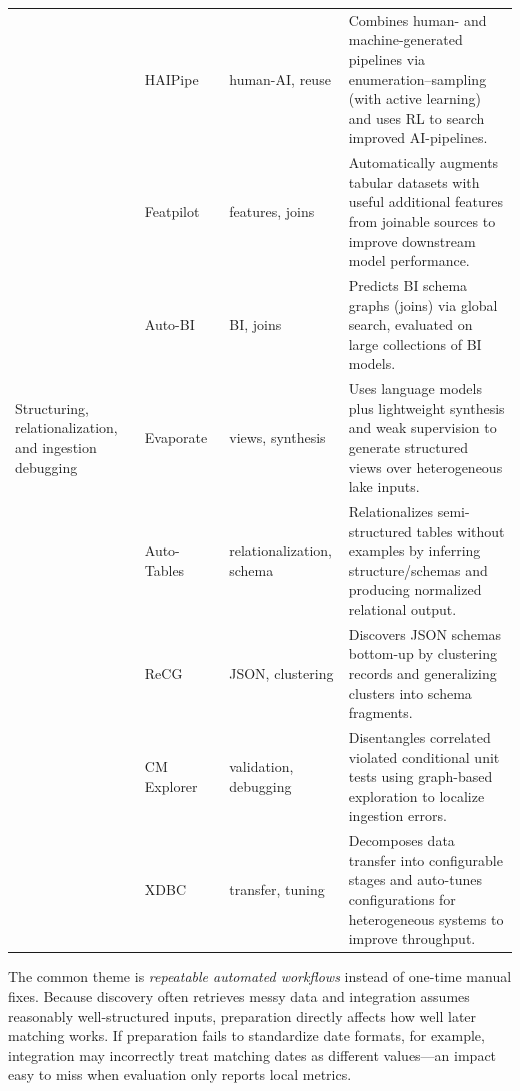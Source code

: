 \documentclass[sigconf]{acmart}
\begin{document}
\begin{table}[!htbp]
\begin{tabularx}{\textwidth}{@{}p{24mm}p{28mm}p{18mm}Y@{}}
~ &
HAIPipe~\cite{10.1145/3588945} &
human-AI, reuse &
Combines human- and machine-generated pipelines via enumeration--sampling (with active learning) and uses RL to search improved AI-pipelines. \\

~ &
Featpilot~\cite{11113027} &
features, joins &
Automatically augments tabular datasets with useful additional features from joinable sources to improve downstream model performance. \\

~ &
Auto-BI~\cite{10.14778/3603581.3603596} &
BI, joins &
Predicts BI schema graphs (joins) via global search, evaluated on large collections of BI models. \\

\midrule

Structuring, relationalization, and ingestion debugging &
Evaporate~\cite{10.14778/3626292.3626294} &
views, synthesis &
Uses language models plus lightweight synthesis and weak supervision to generate structured views over heterogeneous lake inputs. \\

~ &
Auto-Tables~\cite{10.1145/3665252.3665269} &
relationalization, schema &
Relationalizes semi-structured tables without examples by inferring structure/schemas and producing normalized relational output. \\

~ &
ReCG~\cite{10.14778/3681954.3682019} &
JSON, clustering &
Discovers JSON schemas bottom-up by clustering records and generalizing clusters into schema fragments. \\

~ &
CM Explorer~\cite{10.14778/3611540.3611595} &
validation, debugging &
Disentangles correlated violated conditional unit tests using graph-based exploration to localize ingestion errors. \\

~ &
XDBC~\cite{10.1145/3725294} &
transfer, tuning &
Decomposes data transfer into configurable stages and auto-tunes configurations for heterogeneous systems to improve throughput. \\

\bottomrule
\end{tabularx}
\end{table}

The common theme is \emph{repeatable automated workflows} instead of one-time manual fixes. Because discovery often retrieves messy data and integration assumes reasonably well-structured inputs, preparation directly affects how well later matching works. If preparation fails to standardize date formats, for example, integration may incorrectly treat matching dates as different values---an impact easy to miss when evaluation only reports local metrics.
\end{document}

